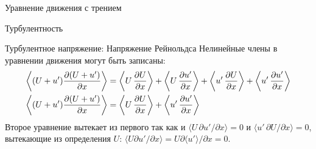 \begin{chapter}{Уравнение движения с трением}
\begin{section}{Турбулентность}
\begin{paragraph}{Турбулентное напряжение: Напряжение Рейнольдса}
Нелинейные члены в уравнении движения могут быть записаны:
\begin{align}
\left< (U+u')\frac{\partial{(U+u')}}{\partial{x}} \right> &= \left<
U\,\frac{\partial{U}}{\partial{x}}\right> +
\left< U\,\frac {\partial{u'}}{\partial{x}}\right> +
\left< u' \,\frac {\partial{U}}{\partial{x}}\right> + \left< u' \,\frac
{\partial{u'}}{\partial{x}}\right> \notag \\
\left< (U+u')\frac{\partial{(U+u')}}{\partial{x}} \right> &= \left<
U\,\frac{\partial{U}}{\partial{x}}\right> +
\left<u' \,\frac{\partial{u'}}{\partial{x}}\right>
\end{align}
Второе уравнение вытекает из первого так как и 
$\langle U\,\partial{u'}/\partial{x}\rangle = 0$ 
и $\langle u'\,\partial{U}/\partial{x}\rangle = 0$, 
вытекающие из определения $U$:
$\langle U \partial{u'}/\partial{x}\rangle 
 = U \partial{\langle u' \rangle }/\partial{x} = 0$.
%


\end{paragraph}
\end{section}
\end{chapter}
